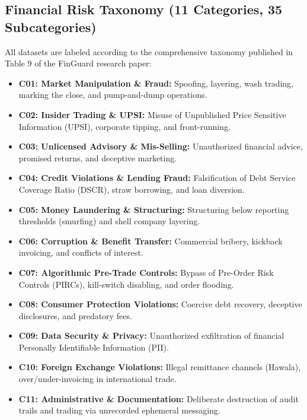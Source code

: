 \documentclass[11pt,a4paper]{article}
\begin{document}
\subsection{Financial Risk Taxonomy (11 Categories, 35 Subcategories)}
All datasets are labeled according to the comprehensive taxonomy published in Table 9 of the FinGuard research paper:
\begin{itemize}[noitemsep]
    \item \textbf{C01: Market Manipulation \& Fraud:} Spoofing, layering, wash trading, marking the close, and pump-and-dump operations.
    \item \textbf{C02: Insider Trading \& UPSI:} Misuse of Unpublished Price Sensitive Information (UPSI), corporate tipping, and front-running.
    \item \textbf{C03: Unlicensed Advisory \& Mis-Selling:} Unauthorized financial advice, promised returns, and deceptive marketing.
    \item \textbf{C04: Credit Violations \& Lending Fraud:} Falsification of Debt Service Coverage Ratio (DSCR), straw borrowing, and loan diversion.
    \item \textbf{C05: Money Laundering \& Structuring:} Structuring below reporting thresholds (smurfing) and shell company layering.
    \item \textbf{C06: Corruption \& Benefit Transfer:} Commercial bribery, kickback invoicing, and conflicts of interest.
    \item \textbf{C07: Algorithmic Pre-Trade Controls:} Bypass of Pre-Order Risk Controls (PIRCs), kill-switch disabling, and order flooding.
    \item \textbf{C08: Consumer Protection Violations:} Coercive debt recovery, deceptive disclosures, and predatory fees.
    \item \textbf{C09: Data Security \& Privacy:} Unauthorized exfiltration of financial Personally Identifiable Information (PII).
    \item \textbf{C10: Foreign Exchange Violations:} Illegal remittance channels (Hawala), over/under-invoicing in international trade.
    \item \textbf{C11: Administrative \& Documentation:} Deliberate destruction of audit trails and trading via unrecorded ephemeral messaging.
\end{itemize}
\end{document}
